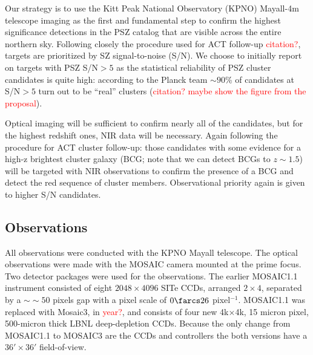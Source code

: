 \documentclass[apj, revtex4]{emulateapj}
\newcommand{\editorial}[1]{\textcolor{red}{#1}}
\begin{document}
Our strategy is to use the Kitt Peak National Observatory (KPNO) Mayall-4m telescope imaging as the first and fundamental step to confirm the highest significance detections in the PSZ catalog that are visible across the entire northern sky. Following closely the procedure used for ACT follow-up \editorial{citation?}, targets are prioritized by SZ signal-to-noise (S/N). We choose to initially report on targets with PSZ S/N$>5$ as the statistical reliability of PSZ cluster candidates is quite high: according to the Planck team $\sim90$\% of candidates at S/N$>5$ turn out to be ``real'' clusters (\editorial{citation? maybe show the figure from the proposal}).


Optical imaging will be sufficient to confirm nearly all of the candidates, but for the highest redshift ones, NIR data will be necessary. Again following the procedure for ACT cluster follow-up: those candidates with some evidence for a high-z brightest cluster galaxy (BCG; note that we can detect BCGs to $z \sim 1.5$) will be targeted with NIR observations to confirm the presence of a BCG and detect the red sequence of cluster members. Observational priority again is given to higher S/N candidates. 

\subsection{Observations}\label{sec: observations}
All observations were conducted with the KPNO Mayall telescope. The optical observations were made with the MOSAIC camera mounted at the prime focus. Two detector packages were used for the observations. The earlier MOSAIC1.1 instrument consisted of eight $2048\times4096$ SITe CCDs, arranged $2\times4$, separated by a $∼\sim50$ pixels gap with a pixel scale of $0\farcs26$ pixel$^{-1}$. MOSAIC1.1 was replaced with Mosaic3, in \editorial{year?},  and consists of four new 4k$\times$4k, 15 micron pixel, 500-micron thick LBNL deep-depletion CCDs. Because the only change from MOSAIC1.1 to MOSAIC3 are the CCDs and controllers the both versions have a $36' \times 36'$ field-of-view.
\end{document}
